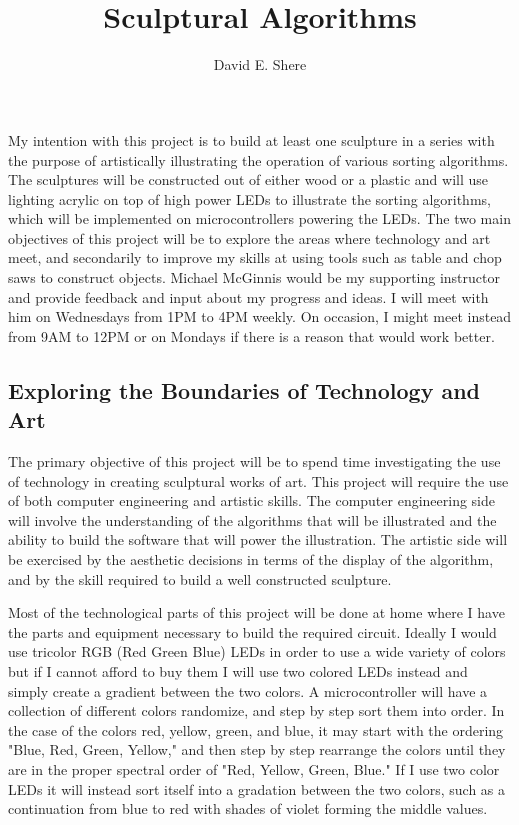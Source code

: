 \documentclass[12pt,a4paper]{article}
\title{\textbf{\doctitle}\\
Sculptural Algorithms}
\author{David E. Shere}
\begin{document}
\thispagestyle{empty}

\maketitle

My intention with this project is to build at least one sculpture in a series
with the purpose of artistically illustrating the operation of various sorting
algorithms\cite{wiki:sorting_algorithm}.  The sculptures will be constructed out
of either wood or a plastic and will use lighting acrylic on top of high power
LEDs to illustrate the sorting algorithms, which will be implemented on
microcontrollers powering the LEDs.  The two main objectives of this project
will be to explore the areas where technology and art meet, and secondarily to
improve my skills at using tools such as table and chop saws to construct
objects.  Michael McGinnis would be my supporting instructor and provide
feedback and input about my progress and ideas.  I will meet with him on
Wednesdays from 1PM to 4PM weekly.  On occasion, I might meet instead from 9AM to
12PM or on Mondays if there is a reason that would work better.

\subsection*{Exploring the Boundaries of Technology and Art}

The primary objective of this project will be to spend time investigating the
use of technology in creating sculptural works of art.  This project will
require the use of both computer engineering and artistic skills.  The computer
engineering side will involve the understanding of the algorithms that will be
illustrated and the ability to build the software that will power the
illustration.  The artistic side will be exercised by the aesthetic decisions in
terms of the display of the algorithm, and by the skill required to build a well
constructed sculpture.

Most of the technological parts of this project will be done at home where I
have the parts and equipment necessary to build the required circuit.  Ideally I
would use tricolor RGB (Red Green Blue) LEDs in order to use a wide variety of
colors but if I cannot afford to buy them I will use two colored LEDs instead
and simply create a gradient between the two colors.  A
microcontroller will have a collection of different colors
randomize, and step by step sort them into order.  In the case of the colors red,
yellow, green, and blue, it may start with the ordering "Blue, Red, Green,
Yellow," and then step by step rearrange the colors until they are in the proper
spectral order of "Red, Yellow, Green, Blue."  If I use two color LEDs it will
instead sort itself into a gradation between the two colors, such as a
continuation from blue to red with shades of violet forming the middle values.
\end{document}
